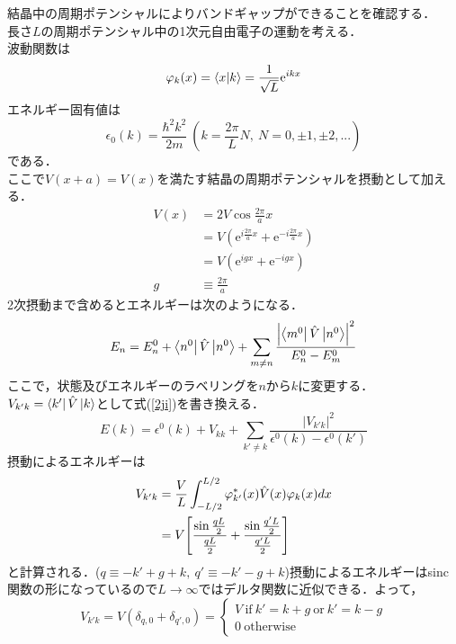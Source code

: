 \documentclass{report}
\begin{document}
  結晶中の周期ポテンシャルによりバンドギャップができることを確認する．\\
  長さ$L$の周期ポテンシャル中の1次元自由電子の運動を考える．\\
  波動関数は
  \begin{equation}
    \varphi_k(x)=\braket{x}{k}=\frac{1}{\sqrt{L}}\mathrm{e}^{ikx}
  \end{equation}
  エネルギー固有値は
  \begin{equation}
    \epsilon_0(k)=\frac{\hbar^2k^2}{2m}\ (k=\frac{2\pi}{L}N,\ N=0,\pm1,\pm2,...)
  \end{equation}
  である．\\
  ここで$V(x+a)=V(x)$を満たす結晶の周期ポテンシャルを摂動として加える．
  \begin{align}
    V(x)&=2V\cos\frac{2\pi}{a}x\\
    &=V(\mathrm{e}^{i\frac{2\pi}{a}x}+\mathrm{e}^{-i\frac{2\pi}{a}x})\\
    &=V(\mathrm{e}^{igx}+\mathrm{e}^{-igx})\\
    g&\equiv\frac{2\pi}{a}
  \end{align}
  2次摂動まで含めるとエネルギーは次のようになる．
  \begin{equation}
    \label{2ji}
    E_n=E_n^0+\bra{n^0}\hat{V}\ket{n^0}+\sum_{m\ne n}\frac{\qty|\bra{m^0}\hat{V}\ket{n^0}|^2}{E_n^0-E_m^0}
  \end{equation}
  ここで，状態及びエネルギーのラベリングを$n$から$k$に変更する．$V_{k'k}=\bra{k'}\hat{V}\ket{k}$として式(\ref{2ji})を書き換える．
  \begin{equation}
    E(k)=\epsilon^0(k)+V_{kk}+\sum_{k'\ne k}\frac{|V_{k'k}|^2}{\epsilon^0(k)-\epsilon^0(k')}
  \end{equation}
  摂動によるエネルギーは
  \begin{align}
    V_{k'k}&=\frac{V}{L}\int_{-L/2}^{L/2}\varphi_{k'}^{*}(x)\hat{V}(x)\varphi_k(x)dx\\
    &=V\qty[\frac{\sin\frac{qL}{2}}{\frac{qL}{2}}+\frac{\sin\frac{q'L}{2}}{\frac{q'L}{2}}]\\
  \end{align}
  と計算される．($q\equiv -k'+g+k,\ q'\equiv -k'-g+k$)摂動によるエネルギーはsinc関数の形になっているので$L\to\infty$ではデルタ関数に近似できる．よって，
  \begin{equation}
    V_{k'k}=V(\delta_{q,0}+\delta_{q',0})=
    \begin{cases}
      V\ \mathrm{if}\ k'=k+g\ \mathrm{or}\ k'=k-g\\
      0\ \mathrm{otherwise}
    \end{cases}
  \end{equation}
\end{document}
